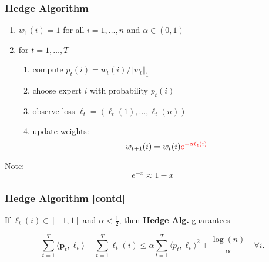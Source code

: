 \documentclass{beamer}
\begin{document}
\begin{frame}
  \frametitle{Hedge Algorithm}
  \begin{enumerate}
    \item $w_1(i) = 1$ for all $i = 1, \dots, n$ and $\alpha \in (0, 1)$
    \item for $t=1, \dots, T$
      \begin{enumerate}
        \item compute $p_t(i) = w_t(i)/\Vert w_t \Vert_1$
        \item choose expert $i$ with probability $p_t(i)$
        \item observe loss $\bm{\ell}_t= (\ell_t(1), \dots, \ell_t(n))$
        \item update weights:
          \begin{equation}
            w_{t+1}(i) =  w_t(i) \textcolor{red}{e^{-\alpha \ell_t(i)}}
          \end{equation}
      \end{enumerate}
  \end{enumerate}
  \vfill
  Note:
  \begin{equation}
    e^{-x} \approx 1-x
  \end{equation}

\end{frame}


\begin{frame}
  \frametitle{Hedge Algorithm [contd]}

  \begin{theorem}
    If $\ell_t(i) \in [-1, 1]$ and $\alpha < \frac12$, then \textbf{Hedge Alg.} guarantees

    \begin{equation}
      \sum_{t=1}^{T} \langle \bm{p}_t, \bm{\ell}_t \rangle  - \sum_{t=1}^{T} \ell_t(i) \le \alpha \sum_{t=1}^{T} \langle p_t, \ell_t \rangle^2 + \frac{\log(n)}{\alpha} \quad \forall i.
    \end{equation}
  \end{theorem}

\end{frame}
\end{document}
